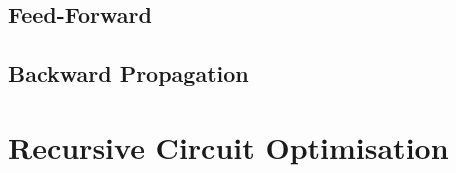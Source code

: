 \subsection{Feed-Forward}\label{sec:FeedForward}


\subsection{Backward Propagation}\label{sec:BackwardPropagation}


\section{Recursive Circuit Optimisation}\label{sec:RCO}


